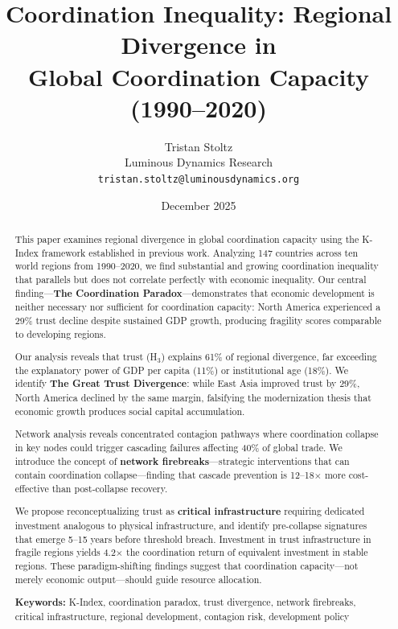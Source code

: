 \documentclass[12pt,a4paper]{article}
\begin{document}
\title{Coordination Inequality: Regional Divergence in \\
Global Coordination Capacity (1990--2020)}

\author{Tristan Stoltz\\
\small{Luminous Dynamics Research}\\
\small{\texttt{tristan.stoltz@luminousdynamics.org}}}

\date{December 2025}

\maketitle

\begin{abstract}
\noindent
This paper examines regional divergence in global coordination capacity using the K-Index framework established in previous work. Analyzing 147 countries across ten world regions from 1990--2020, we find substantial and growing coordination inequality that parallels but does not correlate perfectly with economic inequality. Our central finding---\textbf{The Coordination Paradox}---demonstrates that economic development is neither necessary nor sufficient for coordination capacity: North America experienced a 29\% trust decline despite sustained GDP growth, producing fragility scores comparable to developing regions.

Our analysis reveals that trust (H$_3$) explains 61\% of regional divergence, far exceeding the explanatory power of GDP per capita (11\%) or institutional age (18\%). We identify \textbf{The Great Trust Divergence}: while East Asia improved trust by 29\%, North America declined by the same margin, falsifying the modernization thesis that economic growth produces social capital accumulation.

Network analysis reveals concentrated contagion pathways where coordination collapse in key nodes could trigger cascading failures affecting 40\% of global trade. We introduce the concept of \textbf{network firebreaks}---strategic interventions that can contain coordination collapse---finding that cascade prevention is 12--18$\times$ more cost-effective than post-collapse recovery.

We propose reconceptualizing trust as \textbf{critical infrastructure} requiring dedicated investment analogous to physical infrastructure, and identify pre-collapse signatures that emerge 5--15 years before threshold breach. Investment in trust infrastructure in fragile regions yields 4.2$\times$ the coordination return of equivalent investment in stable regions. These paradigm-shifting findings suggest that coordination capacity---not merely economic output---should guide resource allocation.

\vspace{1em}
\noindent\textbf{Keywords:} K-Index, coordination paradox, trust divergence, network firebreaks, critical infrastructure, regional development, contagion risk, development policy
\end{abstract}
\end{document}
